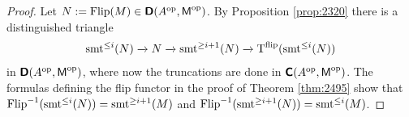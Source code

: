 \begin{proof}
Let 
$N := \operatorname{Flip}(M) \in \boldsymbol{\mathsf{D}}(A^{\mathrm{op}}, \operatorname{\mathsf{M}}^{\mathrm{op}})$. 
By Proposition \ref{prop:2320} there is a distinguished triangle
\[ \operatorname{smt}^{\leq i}(N) \xrightarrow{} N \xrightarrow{} \operatorname{smt}^{\geq i + 1}(N) 
\xrightarrow{} \operatorname{T}^{\mathrm{flip}}(\operatorname{smt}^{\leq i}(N)) \]
in $\boldsymbol{\mathsf{D}}(A^{\mathrm{op}}, \operatorname{\mathsf{M}}^{\mathrm{op}})$,
where now the truncations are done in 
$\boldsymbol{\mathsf{C}}(A^{\mathrm{op}}, \operatorname{\mathsf{M}}^{\mathrm{op}})$. 
The formulas defining the flip functor in the proof of Theorem \ref{thm:2495}
show that \lb
$\operatorname{Flip}^{-1}(\operatorname{smt}^{\leq i}(N)) = \operatorname{smt}^{\geq i + 1}(M)$
and 
$\operatorname{Flip}^{-1}(\operatorname{smt}^{\geq i + 1}(N)) = \operatorname{smt}^{\leq i}(M)$.
\end{proof}



